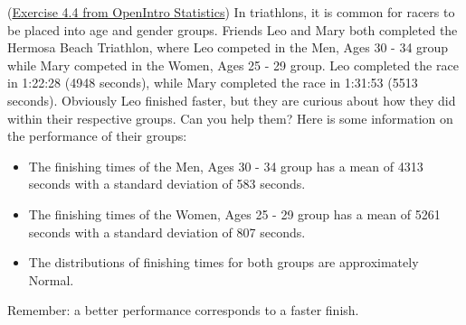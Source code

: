 \documentclass[12pt]{exam}
\newcounter{countA}
\begin{document}
\begin{questions}
\setcounter{question}{\value{countA}}

\question (\href{http://people.hsc.edu/faculty-staff/blins/books/OpenIntroStats4e.pdf\#eoce.4.4}{Exercise 4.4 from OpenIntro Statistics}) 
In triathlons, it is common for racers to be placed into age and gender groups.
Friends Leo and Mary both completed the Hermosa Beach Triathlon, where Leo competed in the Men, Ages
30 - 34 group while Mary competed in the Women, Ages 25 - 29 group. Leo completed the race in 1:22:28
(4948 seconds), while Mary completed the race in 1:31:53 (5513 seconds). Obviously Leo finished faster,
but they are curious about how they did within their respective groups. Can you help them? Here is some
information on the performance of their groups:
\begin{itemize}
\item The finishing times of the Men, Ages 30 - 34 group has a mean of 4313 seconds with a standard
deviation of 583 seconds.
\item The finishing times of the Women, Ages 25 - 29 group has a mean of 5261 seconds with a standard
deviation of 807 seconds.
\item The distributions of finishing times for both groups are approximately Normal.
\end{itemize}
Remember: a better performance corresponds to a faster finish.
\bigskip

\end{questions}
\end{document}
